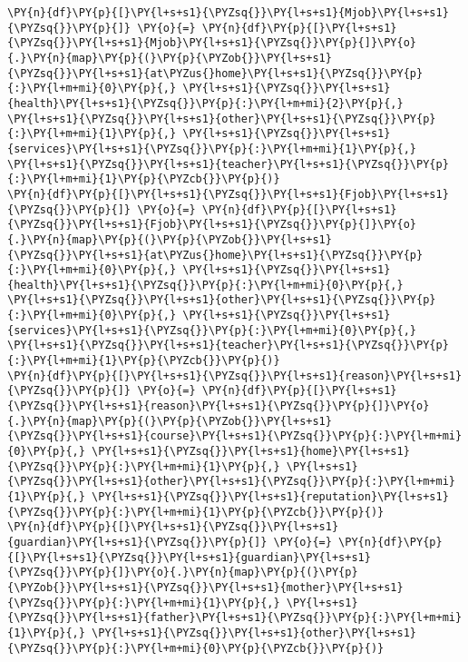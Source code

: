 \begin{tcolorbox}[breakable, size=fbox, boxrule=1pt, pad at break*=1mm,colback=cellbackground, colframe=cellborder]
\begin{Verbatim}[commandchars=\\\{\}]
\PY{n}{df}\PY{p}{[}\PY{l+s+s1}{\PYZsq{}}\PY{l+s+s1}{Mjob}\PY{l+s+s1}{\PYZsq{}}\PY{p}{]} \PY{o}{=} \PY{n}{df}\PY{p}{[}\PY{l+s+s1}{\PYZsq{}}\PY{l+s+s1}{Mjob}\PY{l+s+s1}{\PYZsq{}}\PY{p}{]}\PY{o}{.}\PY{n}{map}\PY{p}{(}\PY{p}{\PYZob{}}\PY{l+s+s1}{\PYZsq{}}\PY{l+s+s1}{at\PYZus{}home}\PY{l+s+s1}{\PYZsq{}}\PY{p}{:}\PY{l+m+mi}{0}\PY{p}{,} \PY{l+s+s1}{\PYZsq{}}\PY{l+s+s1}{health}\PY{l+s+s1}{\PYZsq{}}\PY{p}{:}\PY{l+m+mi}{2}\PY{p}{,} \PY{l+s+s1}{\PYZsq{}}\PY{l+s+s1}{other}\PY{l+s+s1}{\PYZsq{}}\PY{p}{:}\PY{l+m+mi}{1}\PY{p}{,} \PY{l+s+s1}{\PYZsq{}}\PY{l+s+s1}{services}\PY{l+s+s1}{\PYZsq{}}\PY{p}{:}\PY{l+m+mi}{1}\PY{p}{,} \PY{l+s+s1}{\PYZsq{}}\PY{l+s+s1}{teacher}\PY{l+s+s1}{\PYZsq{}}\PY{p}{:}\PY{l+m+mi}{1}\PY{p}{\PYZcb{}}\PY{p}{)}
\PY{n}{df}\PY{p}{[}\PY{l+s+s1}{\PYZsq{}}\PY{l+s+s1}{Fjob}\PY{l+s+s1}{\PYZsq{}}\PY{p}{]} \PY{o}{=} \PY{n}{df}\PY{p}{[}\PY{l+s+s1}{\PYZsq{}}\PY{l+s+s1}{Fjob}\PY{l+s+s1}{\PYZsq{}}\PY{p}{]}\PY{o}{.}\PY{n}{map}\PY{p}{(}\PY{p}{\PYZob{}}\PY{l+s+s1}{\PYZsq{}}\PY{l+s+s1}{at\PYZus{}home}\PY{l+s+s1}{\PYZsq{}}\PY{p}{:}\PY{l+m+mi}{0}\PY{p}{,} \PY{l+s+s1}{\PYZsq{}}\PY{l+s+s1}{health}\PY{l+s+s1}{\PYZsq{}}\PY{p}{:}\PY{l+m+mi}{0}\PY{p}{,} \PY{l+s+s1}{\PYZsq{}}\PY{l+s+s1}{other}\PY{l+s+s1}{\PYZsq{}}\PY{p}{:}\PY{l+m+mi}{0}\PY{p}{,} \PY{l+s+s1}{\PYZsq{}}\PY{l+s+s1}{services}\PY{l+s+s1}{\PYZsq{}}\PY{p}{:}\PY{l+m+mi}{0}\PY{p}{,} \PY{l+s+s1}{\PYZsq{}}\PY{l+s+s1}{teacher}\PY{l+s+s1}{\PYZsq{}}\PY{p}{:}\PY{l+m+mi}{1}\PY{p}{\PYZcb{}}\PY{p}{)}
\PY{n}{df}\PY{p}{[}\PY{l+s+s1}{\PYZsq{}}\PY{l+s+s1}{reason}\PY{l+s+s1}{\PYZsq{}}\PY{p}{]} \PY{o}{=} \PY{n}{df}\PY{p}{[}\PY{l+s+s1}{\PYZsq{}}\PY{l+s+s1}{reason}\PY{l+s+s1}{\PYZsq{}}\PY{p}{]}\PY{o}{.}\PY{n}{map}\PY{p}{(}\PY{p}{\PYZob{}}\PY{l+s+s1}{\PYZsq{}}\PY{l+s+s1}{course}\PY{l+s+s1}{\PYZsq{}}\PY{p}{:}\PY{l+m+mi}{0}\PY{p}{,} \PY{l+s+s1}{\PYZsq{}}\PY{l+s+s1}{home}\PY{l+s+s1}{\PYZsq{}}\PY{p}{:}\PY{l+m+mi}{1}\PY{p}{,} \PY{l+s+s1}{\PYZsq{}}\PY{l+s+s1}{other}\PY{l+s+s1}{\PYZsq{}}\PY{p}{:}\PY{l+m+mi}{1}\PY{p}{,} \PY{l+s+s1}{\PYZsq{}}\PY{l+s+s1}{reputation}\PY{l+s+s1}{\PYZsq{}}\PY{p}{:}\PY{l+m+mi}{1}\PY{p}{\PYZcb{}}\PY{p}{)}
\PY{n}{df}\PY{p}{[}\PY{l+s+s1}{\PYZsq{}}\PY{l+s+s1}{guardian}\PY{l+s+s1}{\PYZsq{}}\PY{p}{]} \PY{o}{=} \PY{n}{df}\PY{p}{[}\PY{l+s+s1}{\PYZsq{}}\PY{l+s+s1}{guardian}\PY{l+s+s1}{\PYZsq{}}\PY{p}{]}\PY{o}{.}\PY{n}{map}\PY{p}{(}\PY{p}{\PYZob{}}\PY{l+s+s1}{\PYZsq{}}\PY{l+s+s1}{mother}\PY{l+s+s1}{\PYZsq{}}\PY{p}{:}\PY{l+m+mi}{1}\PY{p}{,} \PY{l+s+s1}{\PYZsq{}}\PY{l+s+s1}{father}\PY{l+s+s1}{\PYZsq{}}\PY{p}{:}\PY{l+m+mi}{1}\PY{p}{,} \PY{l+s+s1}{\PYZsq{}}\PY{l+s+s1}{other}\PY{l+s+s1}{\PYZsq{}}\PY{p}{:}\PY{l+m+mi}{0}\PY{p}{\PYZcb{}}\PY{p}{)}

\end{Verbatim}
\end{tcolorbox}

